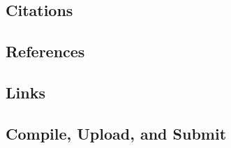\documentclass[10pt]{article}
\begin{document}
\subsection*{Citations}

\subsection*{References}

\subsection*{Links}

\subsection*{Compile, Upload, and Submit}
\end{document}
